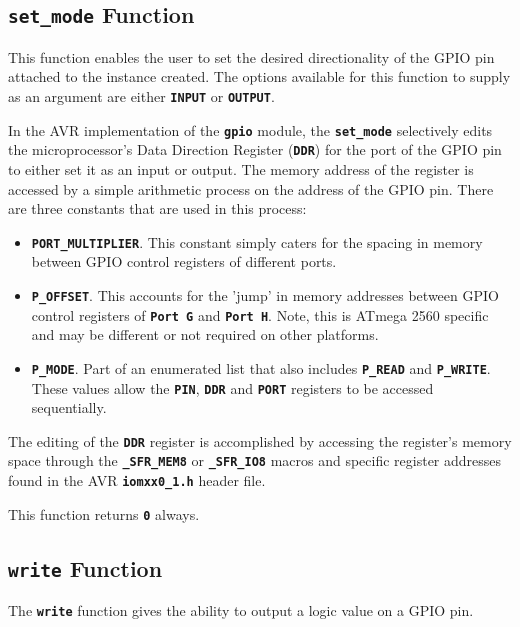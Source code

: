 \documentclass[a4paper, oneside, 11pt, titlepage, onecolumn, openright]{report}
\begin{document}
\subsection{\textbf{\texttt{set\_mode}} Function}
			\label{ss:HALset_modeFunction}
			This function enables the user to set the desired directionality of the GPIO pin attached to the instance created. The options available for this function to supply as an argument are either \textbf{\texttt{INPUT}} or \textbf{\texttt{OUTPUT}}.
			
			In the AVR implementation of the \textbf{\texttt{gpio}} module, the \textbf{\texttt{set\_mode}} selectively edits the microprocessor's Data Direction Register (\textbf{\texttt{DDR}}) for the port of the GPIO pin to either set it as an input or output. The memory address of the register is accessed by a simple arithmetic process on the address of the GPIO pin. There are three constants that are used in this process:
			
\begin{itemize}
\item \textbf{\texttt{PORT\_MULTIPLIER}}. This constant simply caters for the spacing in memory between GPIO control registers of different ports.
\item \textbf{\texttt{P\_OFFSET}}. This accounts for the 'jump' in memory addresses between GPIO control registers of \textbf{\texttt{Port G}} and \textbf{\texttt{Port H}}. Note, this is ATmega 2560 specific and may be different or not required on other platforms.
\item \textbf{\texttt{P\_MODE}}. Part of an enumerated list that also includes \textbf{\texttt{P\_READ}} and \textbf{\texttt{P\_WRITE}}. These values allow the \textbf{\texttt{PIN}}, \textbf{\texttt{DDR}} and \textbf{\texttt{PORT}} registers to be accessed sequentially.
\end{itemize} 
			
			The editing of the \textbf{\texttt{DDR}} register is accomplished by accessing the register's memory space through the \textbf{\texttt{\_SFR\_MEM8}} or \textbf{\texttt{\_SFR\_IO8}} macros and specific register addresses found in the AVR \textbf{\texttt{iomxx0\_1.h}} header file.
			
			This function returns \textbf{\texttt{0}} always.
			
\subsection{\textbf{\texttt{write}} Function}
			\label{ss:HALwriteFunction}
			The \textbf{\texttt{write}} function gives the ability to output a logic value on a GPIO pin.
			
\end{document}
